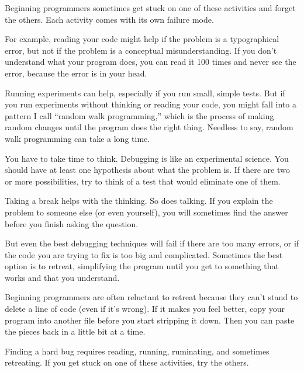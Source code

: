 \documentclass[10pt]{book}
\begin{document}
{\begin{description}
\end{description}

Beginning programmers sometimes get stuck on one of these activities
and forget the others.  Each activity comes with its own failure
mode.


For example, reading your code might help if the problem is a
typographical error, but not if the problem is a conceptual
misunderstanding.  If you don't understand what your program does, you
can read it 100 times and never see the error, because the error is in
your head.


Running experiments can help, especially if you run small, simple
tests.  But if you run experiments without thinking or reading your
code, you might fall into a pattern I call ``random walk programming,''
which is the process of making random changes until the program
does the right thing.  Needless to say, random walk programming
can take a long time.


You have to take time to think.  Debugging is like an
experimental science.  You should have at least one hypothesis about
what the problem is.  If there are two or more possibilities, try to
think of a test that would eliminate one of them.

Taking a break helps with the thinking.  So does talking.
If you explain the problem to someone else (or even yourself), you
will sometimes find the answer before you finish asking the question.

But even the best debugging techniques will fail if there are too many
errors, or if the code you are trying to fix is too big and
complicated.  Sometimes the best option is to retreat, simplifying the
program until you get to something that works and that you
understand.

Beginning programmers are often reluctant to retreat because
they can't stand to delete a line of code (even if it's wrong).
If it makes you feel better, copy your program into another file
before you start stripping it down.  Then you can paste the pieces
back in a little bit at a time.

Finding a hard bug requires reading, running, ruminating, and
sometimes retreating.  If you get stuck on one of these activities,
try the others.


}
\end{document}
